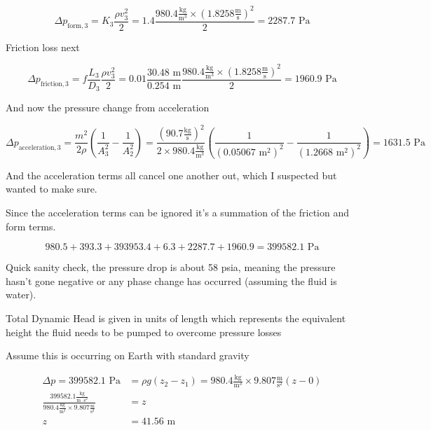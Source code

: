 \documentclass{article}
\begin{document}
\begin{equation}
    \Delta p_{\text{form},3} = K_3 \frac{\rho v_{3}^2}{2} = 1.4 \frac{980.4 \frac{\text{kg}}{\text{m}^3} \times (1.8258 \frac{\text{m}}{\text{s}})^2}{2} = 2287.7 \text{ Pa}
\end{equation}

Friction loss next

\begin{equation}
    \Delta p_{\text{friction},3} = f \frac{L_3}{D_3} \frac{\rho v_3^2}{2} = 0.01 \frac{30.48 \text{ m}}{0.254 \text{ m}} \frac{980.4 \frac{\text{kg}}{\text{m}^3} \times (1.8258 \frac{\text{m}}{\text{s}} )^2}{2} = 1960.9 \text{ Pa}
\end{equation}

And now the pressure change from acceleration

\begin{equation}
    \Delta p_{\text{acceleration},3} = \frac{m^2}{2 \rho} (\frac{1}{A_3^2} - \frac{1}{A_2^2}) = \frac{(90.7 \frac{\text{kg}}{\text{s}})^2}{2 \times 980.4 \frac{\text{kg}}{\text{m}^3}}(\frac{1}{(0.05067 \text{ m}^2)^2} - \frac{1}{(1.2668 \text{ m}^2)^2}) = 1631.5 \text{ Pa}
\end{equation}

And the acceleration terms all cancel one another out, which I suspected but wanted to make sure.

Since the acceleration terms can be ignored it's a summation of the friction and form terms.

\begin{equation}
    980.5 + 393.3 + 393953.4 + 6.3 + 2287.7 + 1960.9 = 399582.1 \text{ Pa}
\end{equation}

Quick sanity check, the pressure drop is about 58 psia, meaning the pressure hasn't gone negative or any phase change has occurred (assuming the fluid is water).

Total Dynamic Head is given in units of length which represents the equivalent height the fluid needs to be pumped to overcome pressure losses

Assume this is occurring on Earth with standard gravity

\begin{align}
    \Delta p = 399582.1 \text{ Pa} &= \rho g (z_2 - z_1) = 980.4 \frac{\text{kg}}{\text{m}^3} \times 9.807 \frac{\text{m}}{\text{s}^2} (z - 0) \\
    \frac{399582.1 \frac{\text{kg}}{\text{m} \cdot \text{s}^2}}{980.4 \frac{\text{kg}}{\text{m}^3} \times 9.807 \frac{\text{m}}{\text{s}^2}} &= z \\
    z &= 41.56 \text{ m}
\end{align}
\end{document}
